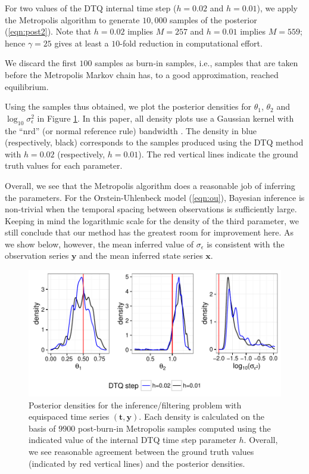 \documentclass[wcp]{jmlr}
\begin{document}
For two values of the DTQ internal time step ($h = 0.02$ and
$h=0.01$), we apply the Metropolis algorithm to generate $10,000$
samples of the posterior (\ref{eqn:post2}).  Note that $h=0.02$
implies $M=257$ and $h=0.01$ implies $M=559$; hence $\gamma=25$
gives at least a $10$-fold reduction in computational effort.

We discard the first $100$ samples as burn-in samples, i.e., samples
that are taken before the Metropolis Markov chain has, to a good
approximation, reached equilibrium.

Using the samples thus obtained, we plot the posterior densities for
$\theta_1$, $\theta_2$ and $\log_{10} \sigma_\epsilon^2$ in Figure
\ref{fig:post_equi}.  In this paper, all density plots use a Gaussian
kernel with the ``nrd'' (or normal reference rule) bandwidth
\citep{Scott2015}.  The density in blue (respectively, black)
corresponds to the samples produced using the DTQ method with $h=0.02$
(respectively, $h=0.01$).  The red vertical lines indicate the ground
truth values for each parameter.

Overall, we see that the Metropolis algorithm does a reasonable job of
inferring the parameters.  For the Orstein-Uhlenbeck model
(\ref{eqn:ou}), Bayesian inference is non-trivial when the temporal
spacing between observations is sufficiently large.  Keeping in mind
the logarithmic scale for the density of the third parameter, we still
conclude that our method has the greatest room for improvement here.
As we show below, however, the mean inferred value of
$\sigma_\epsilon$ is consistent with the observation series
$\mathbf{y}$ and the mean inferred state series $\mathbf{x}$.

\begin{figure}[th]
\begin{center}
\includegraphics[width=6in]{post_equi}
\end{center}
\vspace{-0.25in}
\caption{Posterior densities for the inference/filtering problem with
  equispaced time series $(\mathbf{t},\mathbf{y})$.  Each density is
  calculated on the basis of $9900$ post-burn-in Metropolis samples
  computed  using the indicated value of the internal DTQ time step
  parameter $h$.  Overall, we see reasonable agreement between the
  ground truth values (indicated by red vertical lines) and the
  posterior densities.}
\label{fig:post_equi}
\end{figure}
\end{document}
